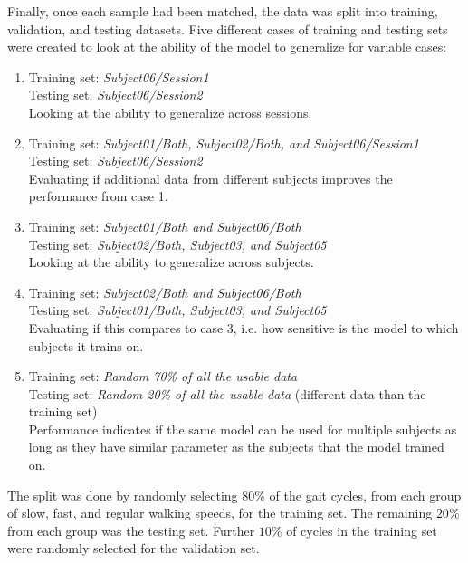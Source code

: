 \documentclass[../main.tex]{subfiles}
\begin{document}
Finally, once each sample had been matched, the data was split into training, validation, and testing datasets.
Five different cases of training and testing sets were created to look at the ability of the model to generalize for variable cases:
\begin{enumerate}
    \item Training set: \textit{Subject06/Session1}\\
            Testing set: \textit{Subject06/Session2}\\
            Looking at the ability to generalize across sessions.
    \item Training set: \textit{Subject01/Both, Subject02/Both, and Subject06/Session1}\\
            Testing set: \textit{Subject06/Session2}\\
            Evaluating if additional data from different subjects improves the performance from case 1.
    \item Training set: \textit{Subject01/Both and Subject06/Both}\\
            Testing set: \textit{Subject02/Both, Subject03, and Subject05}\\
            Looking at the ability to generalize across subjects.
    \item Training set: \textit{Subject02/Both and Subject06/Both}\\
            Testing set: \textit{Subject01/Both, Subject03, and Subject05}\\
            Evaluating if this compares to case 3, i.e. how sensitive is the model to which subjects it trains on.
    \item Training set: \textit{Random 70\% of all the usable data}\\
            Testing set: \textit{Random 20\% of all the usable data} (different data than the training set)\\
            Performance indicates if the same model can be used for multiple subjects as long as they have similar parameter as the subjects that the model trained on.
            
\end{enumerate}
The split was done by randomly selecting $80\%$ of the gait cycles, from each group of slow, fast, and regular walking speeds, for the training set.
The remaining $20\%$ from each group was the testing set.
Further $10\%$ of cycles in the training set were randomly selected for the validation set.
\end{document}
